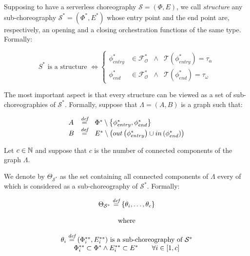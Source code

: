 Supposing to have a serverless choreography $\mathcal{S} = (\Phi,E)$, we call \textit{structure} any sub-choreography $\mathcal{S}^*= (\Phi^*,E^*)$ whose entry point and the end point are, respectively, an opening and a closing orchestration functions of the same type. Formally:

\begin{equation}
	S^* \text{ is a structure } \Leftrightarrow \left\{ \begin{array}{rlll}
		\phi_{entry}^* & \in \mathscr{F_O^*} & \wedge & \mathscr{T}(\phi_{entry}^*) = \tau_{\alpha} \\ 
		\phi_{end}^* & \in \mathscr{F_O^*} & \wedge & \mathscr{T}(\phi_{end}^*) = \tau_{\omega}
	\end{array} \right.
\end{equation}

The most important aspect is that every structure can be viewed as a set of sub-choreographies of $\mathcal{S}^*$. Formally, suppose that $\Lambda = (A,B)$ is a graph such that:

\begin{equation}
\begin{array}{lll}
	A & \overset{\textit{def}}{=} & \Phi^* \setminus \left\lbrace \phi_{entry}^*,\phi_{end}^* \right\rbrace   \\
	B & \overset{\textit{def}}{=} & E^* \setminus \left( out\left(\phi_{entry}^*\right) \cup in\left(\phi_{end}^*\right) \right)
\end{array}
\end{equation}

Let $c \in \mathbb{N}$ and suppose that $c$ is the number of connected components of the graph $\Lambda$.

We denote by $\Theta_{\mathcal{S}^*}$ as the set containing all connected components of $\Lambda$ every of which is considered as a sub-choreography of $\mathcal{S}^*$. Formally:

\begin{equation}
	\begin{array}{c}
		\Theta_{\mathcal{S}^*} \overset{\textit{def}}{=} \left\lbrace \theta_i, \ldots ,\theta_c \right\rbrace \\\\
		\text{ where } \\\\
		
		\theta_i \overset{\textit{def}}{=} (\Phi^{**}_i, E^{**}_i) \text{ is a sub-choreography of } \mathcal{S}^* \\
		 \Phi^{**}_i \subset \Phi^{*} \wedge E^{**}_i \subset E^{*} \qquad \forall i \in \left[ 1, c \right] \\
	\end{array}
\end{equation} 

